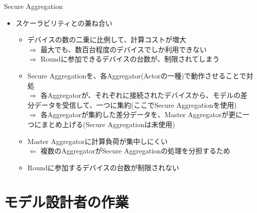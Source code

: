 \documentclass[dvipdfmx,notheorems,t]{beamer}
\begin{document}
\begin{frame}{Secure Aggregation}

\begin{itemize}
	\item スケーラビリティとの兼ね合い
	\begin{itemize}
		\item デバイスの数の二乗に比例して、計算コストが増大 \\
		$\Rightarrow$ 最大でも、数百台程度のデバイスでしか利用できない \\
		$\Rightarrow$ Roundに参加できるデバイスの台数が、制限されてしまう
		\newline
		
		\item Secure Aggregationを、各Aggregator(Actorの一種)で動作させることで対処 \\
		$\Rightarrow$ 各Aggregatorが、それぞれに接続されたデバイスから、モデルの差分データを受信して、一つに集約(ここでSecure Aggregationを使用) \\
		$\Rightarrow$ 各Aggregatorが集約した差分データを、Master Aggregatorが更に一つにまとめ上げる(Secure Aggregationは\alert{未使用})
		\newline
		
		\item Master Aggregatorに計算負荷が集中しにくい \\
		$\Leftarrow$ 複数のAggregatorがSecure Aggregationの処理を分担するため
		\newline
		
		\item Roundに参加するデバイスの台数が制限されない
	\end{itemize}
\end{itemize}

\end{frame}

\section{モデル設計者の作業}
\end{document}
